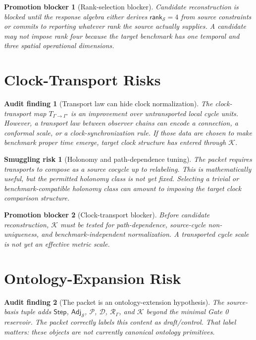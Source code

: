 \documentclass[11pt]{article}
\newcommand{\Step}{\mathsf{Step}}
\newcommand{\Adj}{\mathsf{Adj}_{\mathcal{S}}}
\newcommand{\RespAlg}{\mathcal{R}_{\Gamma}}
\newcommand{\Rank}{\mathsf{rank}_{\mathcal{S}}}
\newtheorem{auditfinding}{Audit finding}
\newtheorem{smugglingrisk}{Smuggling risk}
\newtheorem{promotionblocker}{Promotion blocker}
\begin{document}
\begin{promotionblocker}[Rank-selection blocker]
Candidate reconstruction is blocked until the response algebra either derives
\(\Rank=4\) from source constraints or commits to reporting whatever rank the
source actually supplies. A candidate may not impose rank four because the
target benchmark has one temporal and three spatial operational dimensions.
\end{promotionblocker}

\section{Clock-Transport Risks}

\begin{auditfinding}[Transport law can hide clock normalization]
The clock-transport map \(T_{\Gamma\to\Gamma'}\) is an improvement over
untransported local cycle units. However, a transport law between observer
chains can encode a connection, a conformal scale, or a clock-synchronization
rule. If those data are chosen to make benchmark proper time emerge, target
clock structure has entered through \(\mathcal{K}\).
\end{auditfinding}

\begin{smugglingrisk}[Holonomy and path-dependence tuning]
The packet requires transports to compose as a source cocycle up to relabeling.
This is mathematically useful, but the permitted holonomy class is not yet
fixed. Selecting a trivial or benchmark-compatible holonomy class can amount
to imposing the target clock comparison structure.
\end{smugglingrisk}

\begin{promotionblocker}[Clock-transport blocker]
Before candidate reconstruction, \(\mathcal{K}\) must be tested for
path-dependence, source-cycle non-uniqueness, and benchmark-independent
normalization. A transported cycle scale is not yet an effective metric scale.
\end{promotionblocker}

\section{Ontology-Expansion Risk}

\begin{auditfinding}[The packet is an ontology-extension hypothesis]
The source-basis tuple adds \(\Step\), \(\Adj\), \(\mathcal{P}\),
\(\mathcal{D}\), \(\RespAlg\), and \(\mathcal{K}\) beyond the minimal Gate 0
reservoir. The packet correctly labels this content as draft/control. That
label matters: these objects are not currently canonical ontology primitives.
\end{auditfinding}
\end{document}
